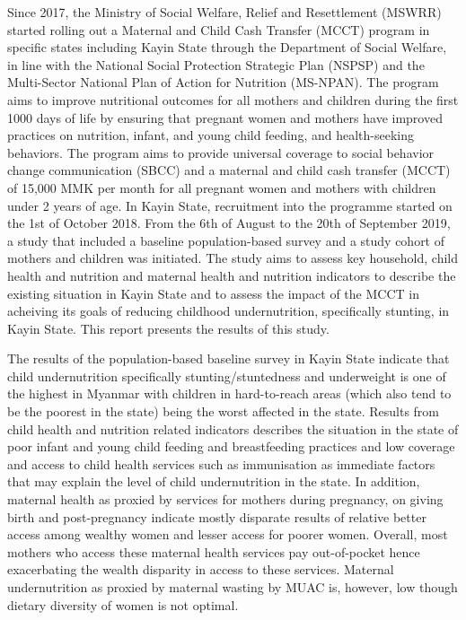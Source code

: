 \documentclass[12pt,a4paper]{article}
\begin{document}
Since 2017, the Ministry of Social Welfare, Relief and Resettlement (MSWRR) started rolling out a Maternal and Child Cash Transfer (MCCT) program in specific states including Kayin State through the Department of Social Welfare, in line with the National Social Protection Strategic Plan (NSPSP) and the Multi-Sector National Plan of Action for Nutrition (MS-NPAN). The program aims to improve nutritional outcomes for all mothers and children during the first 1000 days of life by ensuring that pregnant women and mothers have improved practices on nutrition, infant, and young child feeding, and health-seeking behaviors. The program aims to provide universal coverage to social behavior change communication (SBCC) and a maternal and child cash transfer (MCCT) of 15,000 MMK per month for all pregnant women and mothers with children under 2 years of age. In Kayin State, recruitment into the programme started on the 1st of October 2018. From the 6th of August to the 20th of September 2019, a study that included a baseline population-based survey and a study cohort of mothers and children was initiated. The study aims to assess key household, child health and nutrition and maternal health and nutrition indicators to describe the existing situation in Kayin State and to assess the impact of the MCCT in acheiving its goals of reducing childhood undernutrition, specifically stunting, in Kayin State. This report presents the results of this study.

The results of the population-based baseline survey in Kayin State indicate that child undernutrition specifically stunting/stuntedness and underweight is one of the highest in Myanmar with children in hard-to-reach areas (which also tend to be the poorest in the state) being the worst affected in the state. Results from child health and nutrition related indicators describes the situation in the state of poor infant and young child feeding and breastfeeding practices and low coverage and access to child health services such as immunisation as immediate factors that may explain the level of child undernutrition in the state. In addition, maternal health as proxied by services for mothers during pregnancy, on giving birth and post-pregnancy indicate mostly disparate results of relative better access among wealthy women and lesser access for poorer women. Overall, most mothers who access these maternal health services pay out-of-pocket hence exacerbating the wealth disparity in access to these services. Maternal undernutrition as proxied by maternal wasting by MUAC is, however, low though dietary diversity of women is not optimal.
\end{document}
